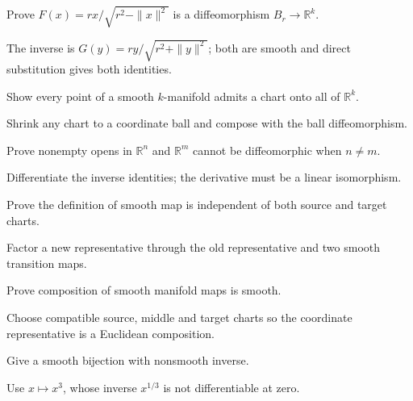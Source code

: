 \begin{problem}\label{prob:vii03-02}
Prove \(F(x)=rx/\sqrt{r^2-\|x\|^2}\) is a diffeomorphism \(B_r\to\mathbb R^k\).
\end{problem}
\begin{solution}
The inverse is \(G(y)=ry/\sqrt{r^2+\|y\|^2}\); both are smooth and direct substitution gives both identities.
\end{solution}

\begin{problem}\label{prob:vii03-03}
Show every point of a smooth \(k\)-manifold admits a chart onto all of \(\mathbb R^k\).
\end{problem}
\begin{solution}
Shrink any chart to a coordinate ball and compose with the ball diffeomorphism.
\end{solution}

\begin{problem}\label{prob:vii03-04}
Prove nonempty opens in \(\mathbb R^n\) and \(\mathbb R^m\) cannot be diffeomorphic when \(n\neq m\).
\end{problem}
\begin{solution}
Differentiate the inverse identities; the derivative must be a linear isomorphism.
\end{solution}

\begin{problem}\label{prob:vii03-05}
Prove the definition of smooth map is independent of both source and target charts.
\end{problem}
\begin{solution}
Factor a new representative through the old representative and two smooth transition maps.
\end{solution}

\begin{problem}\label{prob:vii03-06}
Prove composition of smooth manifold maps is smooth.
\end{problem}
\begin{solution}
Choose compatible source, middle and target charts so the coordinate representative is a Euclidean composition.
\end{solution}

\begin{problem}\label{prob:vii03-07}
Give a smooth bijection with nonsmooth inverse.
\end{problem}
\begin{solution}
Use \(x\mapsto x^3\), whose inverse \(x^{1/3}\) is not differentiable at zero.
\end{solution}

